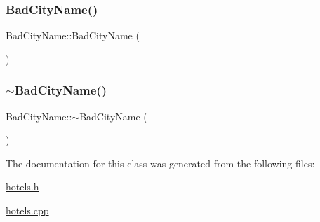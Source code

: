 \subsubsection{\texorpdfstring{Bad\+City\+Name()}{BadCityName()}}
{\footnotesize\ttfamily Bad\+City\+Name\+::\+Bad\+City\+Name (\begin{DoxyParamCaption}{ }\end{DoxyParamCaption})\hspace{0.3cm}{\ttfamily [inline]}}

\mbox{\label{class_bad_city_name_aaa7bda78c16c0f8ef6ebee0c68c03c29}} 
\subsubsection{\texorpdfstring{$\sim$\+Bad\+City\+Name()}{~BadCityName()}}
{\footnotesize\ttfamily Bad\+City\+Name\+::$\sim$\+Bad\+City\+Name (\begin{DoxyParamCaption}{ }\end{DoxyParamCaption})\hspace{0.3cm}{\ttfamily [virtual]}}



The documentation for this class was generated from the following files\+:\begin{DoxyCompactItemize}
\item 
\hyperlink{hotels_8h}{hotels.\+h}\item 
\hyperlink{hotels_8cpp}{hotels.\+cpp}\end{DoxyCompactItemize}
